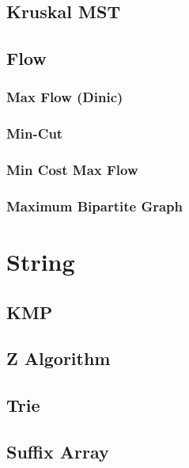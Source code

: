 \documentclass[10pt,oneside]{article}
\begin{document}
\begin{landscape}
\begin{multicols}{2}
\subsection{Kruskal MST}

\subsection{Flow}

\subsubsection{Max Flow (Dinic)}

\subsubsection{Min-Cut}

\subsubsection{Min Cost Max Flow}

\subsubsection{Maximum Bipartite Graph}


\section{String}

\subsection{KMP}

\subsection{Z Algorithm}

\subsection{Trie}

\subsection{Suffix Array}



\end{multicols}
\end{landscape}
\end{document}

